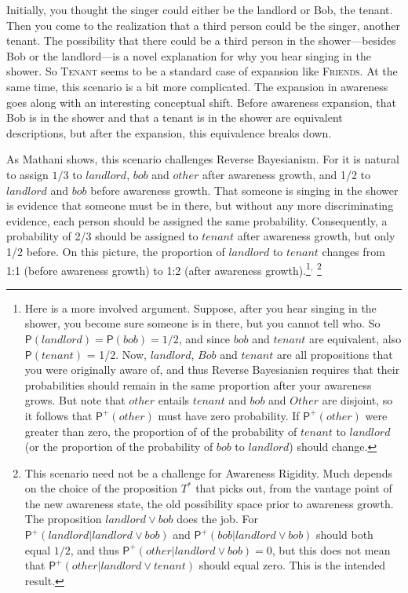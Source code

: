 \documentclass[
  11pt,
  dvipsnames,enabledeprecatedfontcommands]{scrartcl}
\newcommand{\pr}[1]{\ensuremath{\mathsf{P}(#1)}}
\newcommand{\ppr}[2]{\ensuremath{\mathsf{P}^{#1}(#2)}}
\begin{document}
\doublespace

\noindent Initially, you thought the singer could either be the landlord
or Bob, the tenant. Then you come to the realization that a third person
could be the singer, another tenant. The possibility that there could be
a third person in the shower---besides Bob or the landlord---is a novel
explanation for why you hear singing in the shower. So \textsc{Tenant}
seems to be a standard case of expansion like \textsc{Friends}. At the
same time, this scenario is a bit more complicated. The expansion in
awareness goes along with an interesting conceptual shift. Before
awareness expansion, that Bob is in the shower and that a tenant is in
the shower are equivalent descriptions, but after the expansion, this
equivalence breaks down.

As Mathani shows, this scenario challenges Reverse Bayesianism. For it
is natural to assign \(1/3\) to \(landlord\), \(bob\) and \(other\)
after awareness growth, and 1/2 to \(landlord\) and \(bob\) before
awareness growth. That someone is singing in the shower is evidence that
someone must be in there, but without any more discriminating evidence,
each person should be assigned the same probability. Consequently, a
probability of 2/3 should be assigned to \(tenant\) after awareness
growth, but only 1/2 before. On this picture, the proportion of
\(landlord\) to \(tenant\) changes from 1:1 (before awareness growth) to
1:2 (after awareness growth).\footnote{ Here is a more involved
  argument. Suppose, after you hear singing in the shower, you become
  sure someone is in there, but you cannot tell who. So
  \(\pr{landlord} = \pr{bob} = 1/2\), and since \(bob\) and \(tenant\)
  are equivalent, also \(\pr{tenant}\) = 1/2. Now, \(landlord\), \(Bob\)
  and \(tenant\) are all propositions that you were originally aware of,
  and thus Reverse Bayesianisn requires that their probabilities should
  remain in the same proportion after your awareness grows. But note
  that \(other\) entails \(tenant\) and \(bob\) and \(Other\) are
  disjoint, so it follows that \(\ppr{+}{other}\) must have zero
  probability. If \(\ppr{+}{other}\) were greater than zero, the
  proportion of of the probability of \(tenant\) to \(landlord\) (or the
  proportion of the probability of \(bob\) to \(landlord\)) should
  change.}\(^{,}\) \footnote{This scenario need not be a challenge for
  Awareness Rigidity. Much depends on the choice of the proposition
  \(T^*\) that picks out, from the vantage point of the new awareness
  state, the old possibility space prior to awareness growth. The
  proposition \(landlord \vee bob\) does the job. For
  \(\ppr{+}{landlord \vert landlord \vee bob}\) and
  \(\ppr{+}{bob \vert landlord \vee bob}\) should both equal \(1/2\),
  and thus \(\ppr{+}{other \vert landlord \vee bob}=0\), but this does
  not mean that \(\ppr{+}{other \vert landlord \vee tenant}\) should
  equal zero. This is the intended result.}
\end{document}
